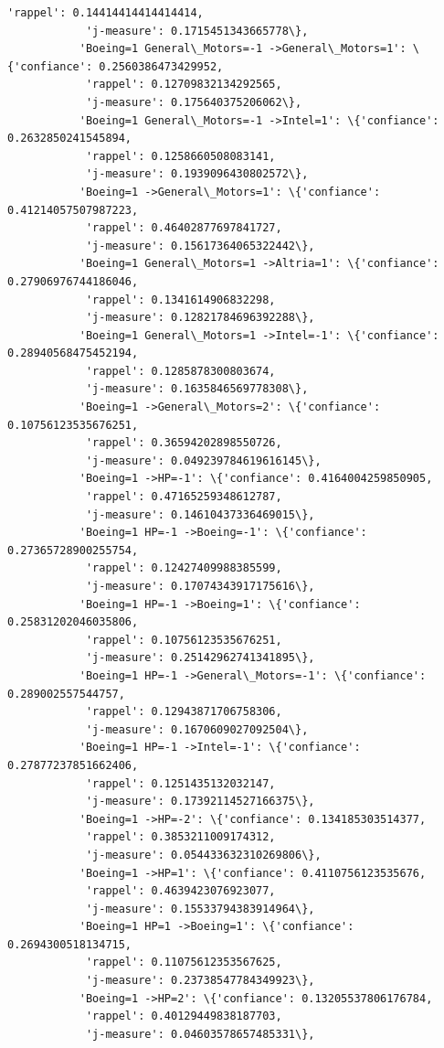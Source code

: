 \documentclass[11pt]{article}
\begin{document}
\begin{Verbatim}[commandchars=\\\{\}]
            'rappel': 0.14414414414414414,
            'j-measure': 0.1715451343665778\},
           'Boeing=1 General\_Motors=-1 ->General\_Motors=1': \{'confiance': 0.2560386473429952,
            'rappel': 0.12709832134292565,
            'j-measure': 0.175640375206062\},
           'Boeing=1 General\_Motors=-1 ->Intel=1': \{'confiance': 0.2632850241545894,
            'rappel': 0.1258660508083141,
            'j-measure': 0.1939096430802572\},
           'Boeing=1 ->General\_Motors=1': \{'confiance': 0.41214057507987223,
            'rappel': 0.46402877697841727,
            'j-measure': 0.15617364065322442\},
           'Boeing=1 General\_Motors=1 ->Altria=1': \{'confiance': 0.27906976744186046,
            'rappel': 0.1341614906832298,
            'j-measure': 0.12821784696392288\},
           'Boeing=1 General\_Motors=1 ->Intel=-1': \{'confiance': 0.28940568475452194,
            'rappel': 0.1285878300803674,
            'j-measure': 0.1635846569778308\},
           'Boeing=1 ->General\_Motors=2': \{'confiance': 0.10756123535676251,
            'rappel': 0.36594202898550726,
            'j-measure': 0.049239784619616145\},
           'Boeing=1 ->HP=-1': \{'confiance': 0.4164004259850905,
            'rappel': 0.47165259348612787,
            'j-measure': 0.14610437336469015\},
           'Boeing=1 HP=-1 ->Boeing=-1': \{'confiance': 0.27365728900255754,
            'rappel': 0.12427409988385599,
            'j-measure': 0.17074343917175616\},
           'Boeing=1 HP=-1 ->Boeing=1': \{'confiance': 0.25831202046035806,
            'rappel': 0.10756123535676251,
            'j-measure': 0.25142962741341895\},
           'Boeing=1 HP=-1 ->General\_Motors=-1': \{'confiance': 0.289002557544757,
            'rappel': 0.12943871706758306,
            'j-measure': 0.1670609027092504\},
           'Boeing=1 HP=-1 ->Intel=-1': \{'confiance': 0.27877237851662406,
            'rappel': 0.1251435132032147,
            'j-measure': 0.17392114527166375\},
           'Boeing=1 ->HP=-2': \{'confiance': 0.134185303514377,
            'rappel': 0.3853211009174312,
            'j-measure': 0.054433632310269806\},
           'Boeing=1 ->HP=1': \{'confiance': 0.4110756123535676,
            'rappel': 0.4639423076923077,
            'j-measure': 0.15533794383914964\},
           'Boeing=1 HP=1 ->Boeing=1': \{'confiance': 0.2694300518134715,
            'rappel': 0.11075612353567625,
            'j-measure': 0.23738547784349923\},
           'Boeing=1 ->HP=2': \{'confiance': 0.13205537806176784,
            'rappel': 0.40129449838187703,
            'j-measure': 0.04603578657485331\},

\end{Verbatim}
\end{document}
